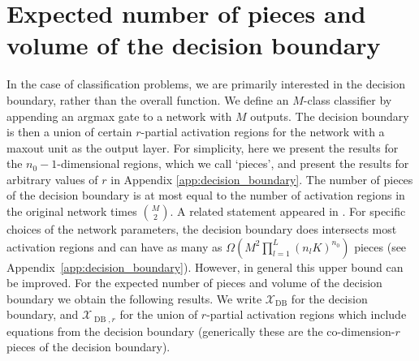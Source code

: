 \documentclass{article}
\theoremstyle{definition}
\begin{document}
\section{Expected number of pieces and volume of the decision boundary}

In the case of classification problems, we are primarily interested in the decision boundary, rather than the overall function. We define an $M$-class classifier by appending an argmax gate to a network with $M$ outputs.
%
The decision boundary is then a union of certain $r$-partial activation regions for the network with a maxout unit as the output layer.
For simplicity, here we present the results for the $n_0-1$-dimensional regions, which we call `pieces', and present the results for
arbitrary values of $r$ in Appendix \ref{app:decision_boundary}. 
%
The number of pieces of the decision boundary is at most equal to the number of activation regions in the original network times $\binom{M}{2}$. 
A related statement appeared in \cite{alfarra2020on}.
For specific choices of the network parameters, the decision boundary does intersects most activation regions and can have as many as $\Omega (M^2  \prod_{l=1}^L(n_l K)^{n_0})$ pieces (see Appendix~\ref{app:decision_boundary}).
However, in general this upper bound can be improved. 
For the expected number of pieces and volume of the decision boundary we obtain the following results. 
%
We write $\mathcal{X}_{\operatorname{DB}}$ for the decision boundary, and $\mathcal{X}_{\operatorname{DB},r}$ for the union of $r$-partial activation regions which include equations from the decision boundary (generically these are the co-dimension-$r$ pieces of the decision boundary). 
\end{document}
